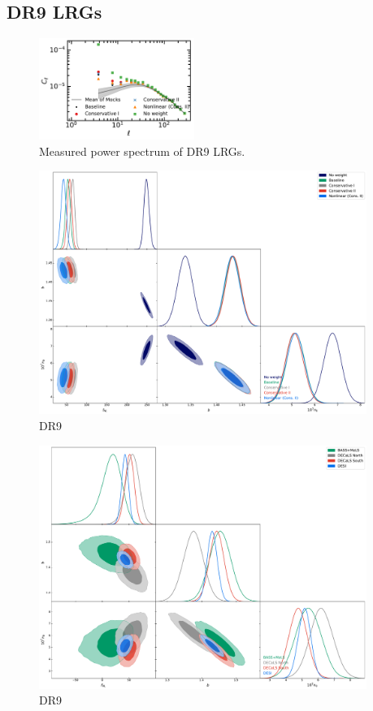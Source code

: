 \subsection{DR9 LRGs}
\begin{figure}
    \centering
    \includegraphics[width=0.45\textwidth]{figures/cl_obs.pdf} 
    \caption{Measured power spectrum of DR9 LRGs.}\label{fig:cl_dr9}
\end{figure}

\begin{figure}
    \centering
    \includegraphics[width=0.95\textwidth]{figures/mcmc_dr9.pdf} 
    \caption{DR9}\label{fig:mcmc_dr9}
\end{figure}

\begin{figure}
    \centering
    \includegraphics[width=0.95\textwidth]{figures/mcmc_dr9_2.pdf} 
    \caption{DR9}\label{fig:mcmc_dr9}
\end{figure}

